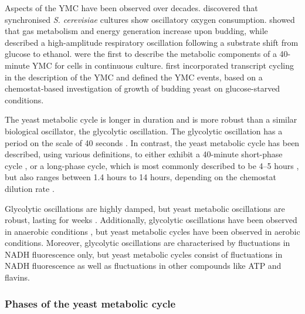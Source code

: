 Aspects of the YMC have been observed over decades.
\citet{nosohSYNCHRONIZATIONBUDDINGCYCLE1962} discovered that synchronised \emph{S. cerevisiae} cultures show oscillatory oxygen consumption.
\citet{kasparvonmeyenburgEnergeticsBuddingCycle1969} showed that gas metabolism and energy generation increase upon budding, while \citet{mochanRespiratoryOscillationsAdapting1973} described a high-amplitude respiratory oscillation following a substrate shift from glucose to ethanol.
\citet{satroutdinovOscillatoryMetabolismSaccharomyces1992} were the first to describe the metabolic components of a 40-minute YMC for cells in continuous culture.
\citet{tuLogicYeastMetabolic2005}
first incorporated transcript cycling in the description of the YMC and defined the YMC events,
based on a chemostat-based investigation of growth of budding yeast on glucose-starved conditions.

The yeast metabolic cycle is longer in duration and is more robust than a similar biological oscillator, the glycolytic oscillation.
The glycolytic oscillation has a period on the scale of 40 seconds \citep{olsenRegulationGlycolyticOscillations2009}.
In contrast, the yeast metabolic cycle has been described, using various definitions, to either exhibit a 40-minute short-phase cycle \citep{lloydUltradianMetronomeTimekeeper2005, liRapidGenomescaleResponse2006, lloydRedoxRhythmicityClocks2007}, or a long-phase cycle, which is most commonly described to be 4--5 hours \citep{tuLogicYeastMetabolic2005, tuCyclicChangesMetabolic2007}, but also ranges between 1.4 hours to 14 hours, depending on the chemostat dilution rate \citep{beuseEffectDilutionRate1998, oneillEukaryoticCellBiology2020}.

Glycolytic oscillations are highly damped, but yeast metabolic oscillations are robust, lasting for weeks \parencite{lloydRedoxRhythmicityClocks2007}.
Additionally, glycolytic oscillations have been observed in anaerobic conditions \citep{lloydSaccharomycesCerevisiaeOscillatory2019}, but yeast metabolic cycles have been observed in aerobic conditions.
Moreover, glycolytic oscillations are characterised by fluctuations in NADH fluorescence only, but yeast metabolic cycles consist of fluctuations in NADH fluorescence as well as fluctuations in other compounds like ATP and flavins.

\subsubsection{Phases of the yeast metabolic cycle}
\label{subsubsec:intro-ymc-definition-phases}

